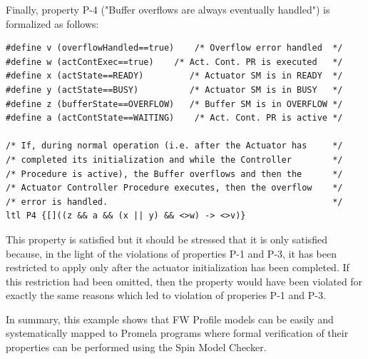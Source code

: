 \documentclass[a4paper,10pt]{article}
\begin{document}
Finally, property P-4 ("Buffer overflows are always eventually handled") is formalized as follows:

\begin{lstlisting}
#define v (overflowHandled==true)    /* Overflow error handled  */
#define w (actContExec==true)    /* Act. Cont. PR is executed   */
#define x (actState==READY)         /* Actuator SM is in READY  */
#define y (actState==BUSY)          /* Actuator SM is in BUSY   */
#define z (bufferState==OVERFLOW)   /* Buffer SM is in OVERFLOW */
#define a (actContState==WAITING)    /* Act. Cont. PR is active */

/* If, during normal operation (i.e. after the Actuator has     */
/* completed its initialization and while the Controller        */
/* Procedure is active), the Buffer overflows and then the      */
/* Actuator Controller Procedure executes, then the overflow    */
/* error is handled.                                            */
ltl P4 {[]((z && a && (x || y) && <>w) -> <>v)}
\end{lstlisting}

\captionsetup[lstlisting]{labelformat=default,labelsep=colon}

This property is satisfied but it should be stressed that it is only satisfied because, in the light of the violations of properties P-1 and P-3, it has been restricted to apply only after the actuator initialization has been completed. If this restriction had been omitted, then the property would have been violated for exactly the same reasons which led to violation of properies P-1 and P-3. 

In summary, this example shows that FW Profile models can be easily and systematically mapped to Promela programs where formal verification of their properties can be performed using the Spin Model Checker.
\end{document}
